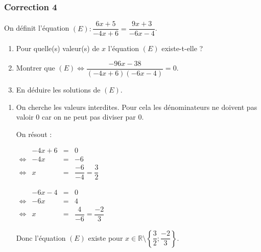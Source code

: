 \documentclass[15pt, mathserif]{beamer}
\newcommand{\R}{\mathbb{R}}			%
\begin{document}
\begin{frame}
\vspace{-10mm}
	\frametitle{Correction 4}
 \vspace*{1cm} 
 
 On définit l'équation $(E):\dfrac{6x+5}{-4x+6}=\dfrac{9x+3}{-6x-4}$. 
 \begin{enumerate} 
 	 \item Pour quelle(s) valeur(s) de $x$ l'équation $(E)$ existe-t-elle ? 
 	 \item Montrer que $(E) \Leftrightarrow \dfrac{-96x-38}{(-4x+6)(-6x-4)}=0$. 
 	 \item En déduire les solutions de $(E)$. 
 \end{enumerate} 
 
 \begin{enumerate} 
 	 \item On cherche les valeurs interdites. Pour cela les dénominateurs ne doivent pas valoir 0 car on ne peut pas diviser par 0. 
 
 	 On résout : 
 
  \begin{minipage}{0.45\linewidth} 
 	 $\begin{array}{crcl} 
 	 	 & -4x+6& = & 0 \\ 
 	 	 	 \Leftrightarrow &-4x & = &-6\\ 
 	 	 	 \Leftrightarrow & x & = & \dfrac{-6}{-4}=\dfrac{3}{2}
 	 	 \end{array} $ 
 	 \end{minipage} \hfil \begin{minipage}{0.45\linewidth} 
 	 $\begin{array}{crcl} 
 	 	 & -6x-4& = & 0 \\ 
 	 	 	 \Leftrightarrow &-6x & = &4 \\ 
 	 	 	 \Leftrightarrow & x & = & \dfrac{4}{-6}=\dfrac{-2}{3}
 	 	 \end{array} $ 
 
 	 \end{minipage} 
 
 Donc l'équation $(E)$ existe pour $x \in \R \setminus \left\{\dfrac{3}{2};\dfrac{-2}{3}\right\}$. 
 \end{enumerate} 
 \end{frame} 
\end{document}
